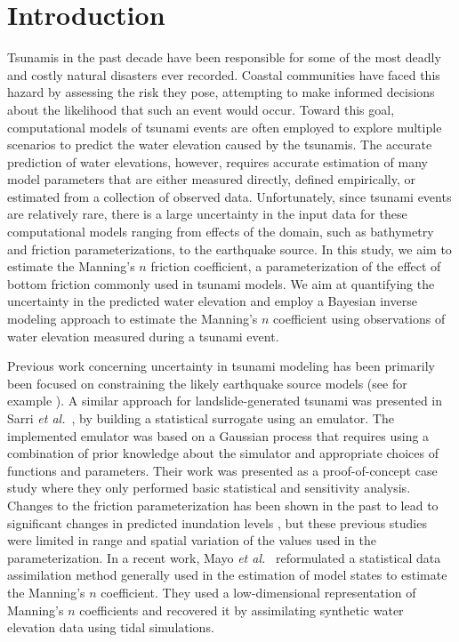
\section{Introduction} \label{sec:intro}

Tsunamis in the past decade have been responsible for some of the most  deadly
and costly natural disasters ever recorded. Coastal communities have faced this
hazard by assessing the risk they pose, attempting  to make informed decisions
about the likelihood that such an event would  occur.
Toward this goal, computational models of  tsunami events are often
employed to explore multiple scenarios to predict the water elevation
caused by the tsunamis. The accurate prediction  of water elevations, however,
requires accurate estimation of many model parameters that are either measured
directly, defined empirically, or estimated from a collection of observed data.
Unfortunately, since tsunami events are relatively rare,  there is a large
uncertainty in the input data for these computational  models ranging from
effects of the domain, such as bathymetry and friction parameterizations,  to
the earthquake source.  In this study, we aim to estimate the Manning's $n$
friction coefficient, a parameterization of the effect of bottom friction 
commonly used in tsunami models.  We aim at quantifying the uncertainty in the 
predicted water elevation  and employ a Bayesian inverse modeling approach to 
estimate the Manning's $n$ coefficient using observations of water elevation 
measured during a tsunami event.

Previous work concerning uncertainty in tsunami modeling has been primarily been focused on constraining the likely earthquake source models (see
for example \cite{MacInnes:2013cr}).  A similar approach for landslide-generated
tsunami was presented in Sarri \emph{et al.}~\cite{Sarri2012}, by building a statistical surrogate
using an emulator. The implemented emulator was based on a Gaussian
process that requires using a combination of prior knowledge about the simulator
and appropriate choices of functions and parameters. Their work was presented as
a proof-of-concept case study where they only performed basic statistical and
sensitivity analysis.  Changes to the friction parameterization has been shown in 
the past to lead to significant changes in predicted inundation levels \cite{Myers:2001el, 
Jakeman:2010hk}, but these previous studies were limited in range and spatial variation of the values used in the parameterization.  
In a recent work, Mayo \emph{et al.}~\cite{Mayo:2014} reformulated a statistical data assimilation method
generally used in the estimation of model states to estimate the Manning's $n$
coefficient. They used a low-dimensional representation of
Manning's $n$ coefficients and recovered it by assimilating synthetic water elevation data using tidal simulations.

